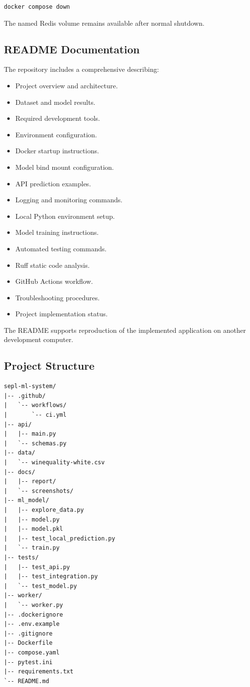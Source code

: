 \documentclass[11pt,a4paper]{article}
\newcommand{\codepath}[1]{\texttt{\detokenize{#1}}}
\begin{document}
\begin{lstlisting}
docker compose down
\end{lstlisting}

The named Redis volume remains available after
normal shutdown.

\subsection{README Documentation}

The repository includes a comprehensive
\codepath{README.md} describing:

\begin{itemize}
    \item Project overview and architecture.
    \item Dataset and model results.
    \item Required development tools.
    \item Environment configuration.
    \item Docker startup instructions.
    \item Model bind mount configuration.
    \item API prediction examples.
    \item Logging and monitoring commands.
    \item Local Python environment setup.
    \item Model training instructions.
    \item Automated testing commands.
    \item Ruff static code analysis.
    \item GitHub Actions workflow.
    \item Troubleshooting procedures.
    \item Project implementation status.
\end{itemize}

The README supports reproduction of the
implemented application on another development
computer.

\subsection{Project Structure}

\begin{lstlisting}
sepl-ml-system/
|-- .github/
|   `-- workflows/
|       `-- ci.yml
|-- api/
|   |-- main.py
|   `-- schemas.py
|-- data/
|   `-- winequality-white.csv
|-- docs/
|   |-- report/
|   `-- screenshots/
|-- ml_model/
|   |-- explore_data.py
|   |-- model.py
|   |-- model.pkl
|   |-- test_local_prediction.py
|   `-- train.py
|-- tests/
|   |-- test_api.py
|   |-- test_integration.py
|   `-- test_model.py
|-- worker/
|   `-- worker.py
|-- .dockerignore
|-- .env.example
|-- .gitignore
|-- Dockerfile
|-- compose.yaml
|-- pytest.ini
|-- requirements.txt
`-- README.md
\end{lstlisting}
\end{document}
